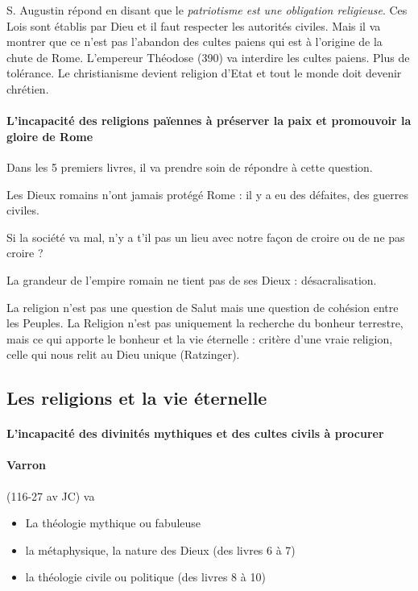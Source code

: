 S. Augustin répond en disant que le \textit{patriotisme est une obligation religieuse}. Ces Lois sont établis par Dieu et il faut respecter les autorités civiles. 
Mais il va montrer que ce n'est pas l'abandon des cultes paiens qui est à l'origine de la chute de Rome.
L'empereur Théodose (390) va interdire les cultes paiens. Plus de tolérance. Le christianisme devient religion d'Etat et tout le monde doit devenir chrétien.

\paragraph{L’incapacité des religions païennes à préserver la paix et promouvoir la gloire de Rome}
 Dans les 5 premiers livres, il va prendre soin de répondre à cette question. 
 
 Les Dieux romains n'ont jamais protégé Rome : il y a eu des défaites, des guerres civiles. 
 
 \begin{Prop}
 Si la société va mal, n'y a t'il pas un lieu avec notre façon de croire ou de ne pas croire ?
 \end{Prop}
 
 La grandeur de l'empire romain ne tient pas de ses Dieux : désacralisation. 
 

\begin{Synthesis}
La religion n'est pas une question de Salut mais une question de cohésion entre les Peuples.
La Religion n'est pas uniquement la recherche du bonheur terrestre, mais ce qui apporte le bonheur et la vie éternelle : critère d'une vraie religion, celle qui nous relit au Dieu unique (Ratzinger).
\end{Synthesis}
 
 \begin{quote}
     
 \end{quote}
 
 
 \subsection{Les religions et la vie éternelle}
 \paragraph{L’incapacité des divinités mythiques et des cultes civils à procurer}
 

\paragraph{Varron} (116-27 av JC) va 
\begin{itemize}
    \item La théologie mythique ou fabuleuse
    \item la métaphysique, la nature des Dieux (des livres 6 à 7)
    \item la théologie civile ou politique (des livres 8 à 10)
\end{itemize}


